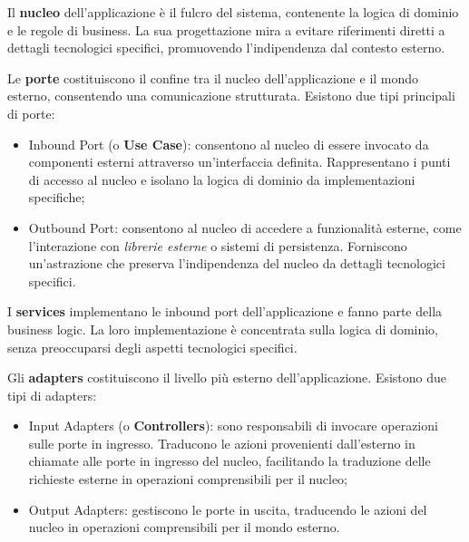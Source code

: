 \documentclass[10pt, a4paper]{article}
\begin{document}
Il \textbf{nucleo} dell'applicazione è il fulcro del sistema, contenente la logica di dominio e le regole di business. La sua progettazione mira a evitare riferimenti diretti a dettagli tecnologici specifici, promuovendo l'indipendenza dal contesto esterno.

Le \textbf{porte} costituiscono il confine tra il nucleo dell'applicazione e il mondo esterno, consentendo una comunicazione strutturata. Esistono due tipi principali di porte:
\begin{itemize}
    \item Inbound Port (o \textbf{Use Case}): consentono al nucleo di essere invocato da componenti esterni attraverso un'interfaccia definita. Rappresentano i punti di accesso al nucleo e isolano la logica di dominio da implementazioni specifiche;
    \item Outbound Port: consentono al nucleo di accedere a funzionalità esterne, come l'interazione con \textit{librerie esterne\pg} o sistemi di persistenza. Forniscono un'astrazione che preserva l'indipendenza del nucleo da dettagli tecnologici specifici.  
\end{itemize}

I \textbf{services} implementano le inbound port dell'applicazione e fanno parte della business logic. La loro implementazione è concentrata sulla logica di dominio, senza preoccuparsi degli aspetti tecnologici specifici.

Gli \textbf{adapters} costituiscono il livello più esterno dell'applicazione. Esistono due tipi di adapters:
\begin{itemize}
    \item Input Adapters (o \textbf{Controllers}): sono responsabili di invocare operazioni sulle porte in ingresso. Traducono le azioni provenienti dall'esterno in chiamate alle porte in ingresso del nucleo, facilitando la traduzione delle richieste esterne in operazioni comprensibili per il nucleo;
    \item Output Adapters: gestiscono le porte in uscita, traducendo le azioni del nucleo in operazioni comprensibili per il mondo esterno.
\end{itemize}
\end{document}
